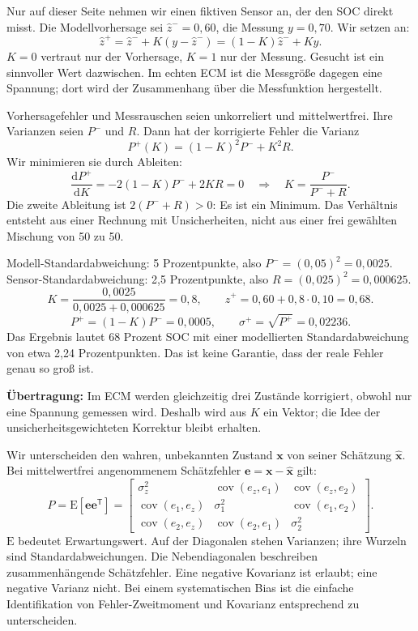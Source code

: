 Nur auf dieser Seite nehmen wir einen fiktiven Sensor an, der den SOC direkt misst. Die Modellvorhersage sei $\hat z^-=0{,}60$, die Messung $y=0{,}70$. Wir setzen an:
\[
\hat z^+=\hat z^-+K(y-\hat z^-)=(1-K)\hat z^-+Ky.
\]
$K=0$ vertraut nur der Vorhersage, $K=1$ nur der Messung. Gesucht ist ein sinnvoller Wert dazwischen. Im echten ECM ist die Messgröße dagegen eine Spannung; dort wird der Zusammenhang über die Messfunktion hergestellt.

Vorhersagefehler und Messrauschen seien unkorreliert und mittelwertfrei. Ihre Varianzen seien $P^-$ und $R$. Dann hat der korrigierte Fehler die Varianz
\[
P^+(K)=(1-K)^2P^-+K^2R.
\]
Wir minimieren sie durch Ableiten:
\[
\frac{\mathrm dP^+}{\mathrm dK}=-2(1-K)P^-+2KR=0
\quad\Longrightarrow\quad
\boxed{K=\frac{P^-}{P^-+R}}.
\]
Die zweite Ableitung ist $2(P^-+R)>0$: Es ist ein Minimum. Das Verhältnis entsteht aus einer Rechnung mit Unsicherheiten, nicht aus einer frei gewählten Mischung von 50 zu 50.

Modell-Standardabweichung: 5 Prozentpunkte, also $P^-=(0{,}05)^2=0{,}0025$. Sensor-Standardabweichung: 2,5 Prozentpunkte, also $R=(0{,}025)^2=0{,}000625$.
\[
K=\frac{0{,}0025}{0{,}0025+0{,}000625}=0{,}8,
\qquad \hat z^+=0{,}60+0{,}8\cdot0{,}10=0{,}68.
\]
\[
P^+=(1-K)P^-=0{,}0005,
\qquad \sigma^+=\sqrt{P^+}=0{,}02236.
\]
Das Ergebnis lautet 68 Prozent SOC mit einer modellierten Standardabweichung von etwa 2,24 Prozentpunkten. Das ist keine Garantie, dass der reale Fehler genau so groß ist.

\textbf{Übertragung:} Im ECM werden gleichzeitig drei Zustände korrigiert, obwohl nur eine Spannung gemessen wird. Deshalb wird aus $K$ ein Vektor; die Idee der unsicherheitsgewichteten Korrektur bleibt erhalten.

Wir unterscheiden den wahren, unbekannten Zustand $\mathbf x$ von seiner Schätzung $\hat{\mathbf x}$. Bei mittelwertfrei angenommenem Schätzfehler $\mathbf e=\mathbf x-\hat{\mathbf x}$ gilt:
\[
P=\mathrm E[\mathbf e\mathbf e^{\mathsf T}]
=\begin{bmatrix}
\sigma_z^2&\operatorname{cov}(e_z,e_1)&\operatorname{cov}(e_z,e_2)\\
\operatorname{cov}(e_1,e_z)&\sigma_1^2&\operatorname{cov}(e_1,e_2)\\
\operatorname{cov}(e_2,e_z)&\operatorname{cov}(e_2,e_1)&\sigma_2^2
\end{bmatrix}.
\]
$\mathrm E$ bedeutet Erwartungswert. Auf der Diagonalen stehen Varianzen; ihre Wurzeln sind Standardabweichungen. Die Nebendiagonalen beschreiben zusammenhängende Schätzfehler. Eine negative Kovarianz ist erlaubt; eine negative Varianz nicht. Bei einem systematischen Bias ist die einfache Identifikation von Fehler-Zweitmoment und Kovarianz entsprechend zu unterscheiden.

